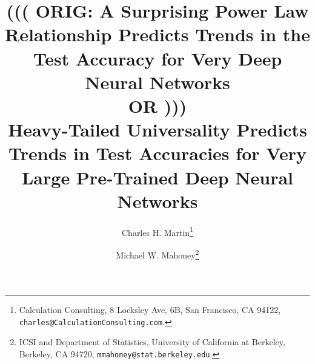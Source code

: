 \documentclass[11pt]{article}
\begin{document}
\title{%
(((
ORIG: 
A Surprising Power Law Relationship Predicts Trends in the Test Accuracy for Very Deep Neural Networks
\\ OR ))) \\ 
Heavy-Tailed Universality Predicts Trends in Test Accuracies for Very Large Pre-Trained Deep Neural Networks
}

\author{%
Charles H. Martin\thanks{Calculation Consulting, 8 Locksley Ave, 6B, San Francisco, CA 94122, \texttt{charles@CalculationConsulting.com}.} 
\and 
Michael W. Mahoney\thanks{ICSI and Department of Statistics, University of California at Berkeley, Berkeley, CA 94720, \texttt{mmahoney@stat.berkeley.edu}.}
}


\date{}
\maketitle









%

{\small
%
%

}

\appendix

\end{document}
